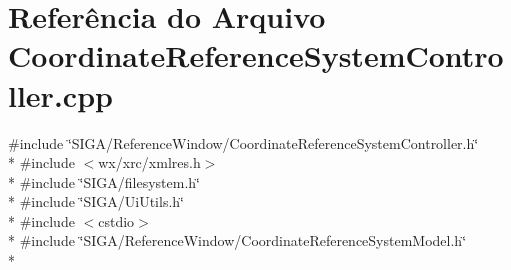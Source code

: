 \section{Referência do Arquivo Coordinate\+Reference\+System\+Controller.\+cpp}
\label{_coordinate_reference_system_controller_8cpp}
{\ttfamily \#include \char`\"{}S\+I\+G\+A/\+Reference\+Window/\+Coordinate\+Reference\+System\+Controller.\+h\char`\"{}}\\*
{\ttfamily \#include $<$wx/xrc/xmlres.\+h$>$}\\*
{\ttfamily \#include \char`\"{}S\+I\+G\+A/filesystem.\+h\char`\"{}}\\*
{\ttfamily \#include \char`\"{}S\+I\+G\+A/\+Ui\+Utils.\+h\char`\"{}}\\*
{\ttfamily \#include $<$cstdio$>$}\\*
{\ttfamily \#include \char`\"{}S\+I\+G\+A/\+Reference\+Window/\+Coordinate\+Reference\+System\+Model.\+h\char`\"{}}\\*
